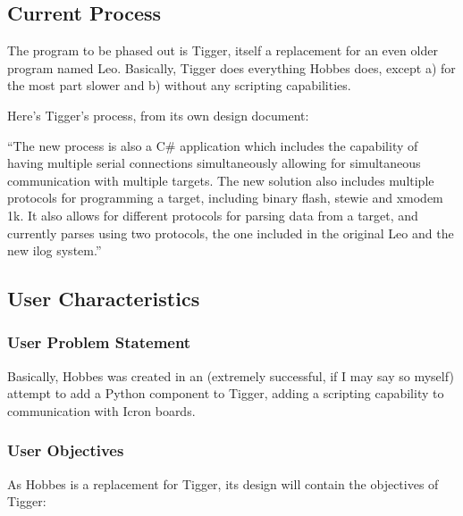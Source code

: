 \documentclass[12pt,letterpaper]{article}
\begin{document}
%
%
\subsection{Current Process}
\label{1.2}

The program to be phased out is Tigger, itself a replacement for an even older program named Leo. Basically, Tigger does everything Hobbes does, except a) for the most part slower and b) without any scripting capabilities.

Here's Tigger's process, from its own design document:

``The new process is also a C\# application which includes the capability of having multiple serial connections simultaneously allowing for simultaneous communication with multiple targets. The new solution also includes multiple protocols for programming a target, including binary flash, stewie and xmodem 1k. It also allows for different protocols for parsing data from a target, and currently parses using two protocols, the one included in the original Leo and the new ilog system.''



%
%
\subsection{User Characteristics}
\label{1.3}

\setcounter{subsubsection}{-1}



%
%
\subsubsection{User Problem Statement}
\label{1.3.0}

Basically, Hobbes was created in an (extremely successful, if I may say so myself) attempt to add a Python component to Tigger, adding a scripting capability to communication with Icron boards.



%
%
\subsubsection{User Objectives}
\label{1.3.1}

As Hobbes is a replacement for Tigger, its design will contain the objectives of Tigger:
\end{document}
